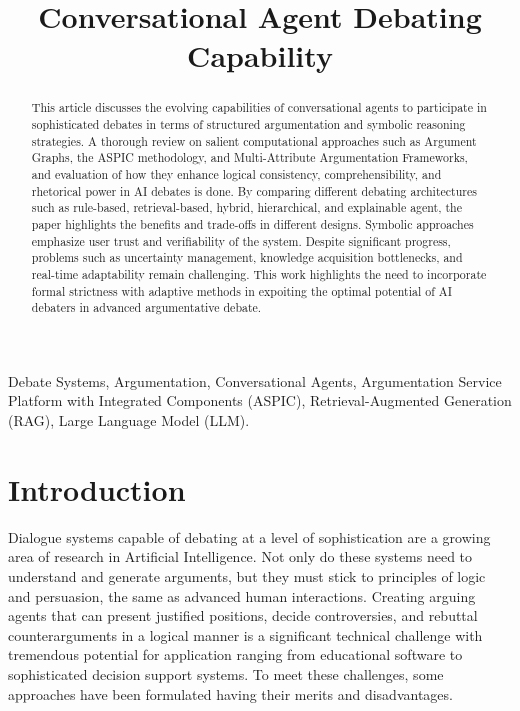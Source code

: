 \documentclass[conference]{IEEEtran}
\begin{document}
\title{Conversational Agent Debating Capability}

\author{
\and
{}
}

\maketitle

\begin{abstract}

This article discusses the evolving capabilities of conversational agents to participate in sophisticated debates in terms
of structured argumentation and symbolic reasoning strategies.
A thorough review on salient computational approaches such as Argument Graphs, the ASPIC methodology, and Multi-Attribute Argumentation Frameworks, and evaluation of how they enhance
logical consistency, comprehensibility, and rhetorical power in AI debates is done. By comparing different debating architectures such as rule-based, retrieval-based, hybrid, hierarchical, and explainable agent, the paper highlights the benefits and trade-offs in different designs. Symbolic approaches emphasize user trust and verifiability of the system.
Despite significant progress, problems such as uncertainty management, knowledge acquisition bottlenecks, and real-time adaptability remain challenging. This work highlights the need to
incorporate formal strictness with adaptive methods in expoiting the optimal potential of AI debaters in advanced argumentative
debate.
\end{abstract}

\begin{IEEEkeywords}
Debate Systems, Argumentation, Conversational Agents, Argumentation Service Platform with Integrated Components (ASPIC), Retrieval-Augmented Generation (RAG), Large Language Model (LLM).
\end{IEEEkeywords}

\section{Introduction}
Dialogue systems capable of debating at a level of sophistication are a growing area of research in Artificial Intelligence. Not only do these systems need to understand and generate arguments, but they must stick to principles of logic and persuasion, the same as advanced human interactions. Creating arguing agents that can present justified positions, decide controversies, and rebuttal counterarguments in a logical manner is a significant technical challenge with tremendous potential for application ranging from educational software to sophisticated decision support systems. To meet these challenges, some approaches have been formulated having their merits and disadvantages.
\end{document}

